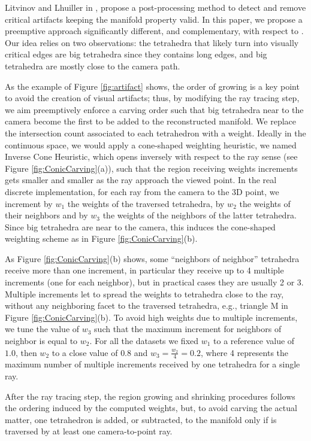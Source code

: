 Litvinov and Lhuiller in \cite{litvinov_Lhiuller14}, propose a post-processing method to detect and remove critical artifacts keeping the manifold property valid.
In this paper, we propose a preemptive approach significantly different, and complementary, with respect to \cite{litvinov_Lhiuller14}. 
Our idea relies on two observations: the tetrahedra that likely turn into visually critical edges are big tetrahedra since they contains long edges, and big tetrahedra are mostly close to the camera path.

As the example of Figure \ref{fig:artifact} shows, the order of growing is a key point to avoid the creation of visual artifacts; thus,
 by modifying the ray tracing step, we aim preemptively enforce a carving order such that big tetrahedra near to the camera become the first to be added to the reconstructed manifold.
We replace the intersection count associated to each tetrahedron with a weight. Ideally in the continuous space, we would apply  a cone-shaped weighting heuristic, we named Inverse Cone Heuristic, which opens inversely with respect to the ray sense (see Figure \ref{fig:ConicCarving}(a)),  such that the region receiving weights increments gets smaller and smaller as the ray approach the viewed point.
In the real discrete implementation, for each ray from the camera to the 3D point, we increment by $w_1$ the weights of the traversed tetrahedra, by $w_2$ the weights of their neighbors and by $w_3$ the weights of the neighbors of the latter tetrahedra.
Since big tetrahedra are near to the camera, this induces the cone-shaped weighting scheme as in Figure \ref{fig:ConicCarving}(b).

As Figure \ref{fig:ConicCarving}(b) shows, some ``neighbors of neighbor'' tetrahedra receive more than one increment, in particular they receive up to 4 multiple increments (one for each neighbor), but in practical cases they are usually 2 or 3.
Multiple increments let to spread the weights to tetrahedra close to the ray, without any  neighboring facet to the traversed tetrahedra, e.g.,  triangle M in Figure \ref{fig:ConicCarving}(b).
To avoid high weights due to multiple increments, we tune the value of $w_3$ such that the maximum increment for neighbors of neighbor is equal to $w_2$.
For all the datasets we fixed $w_1$ to a reference value of $1.0$, then $w_2$ to a close value of $0.8$ and $w_3 = \frac{w_2}{4} = 0.2$, where 4 represents the maximum number of multiple increments received by one tetrahedra for a single ray. 


After the ray tracing step, the region growing and shrinking procedures follows the ordering induced by the computed weights, but, to avoid carving the actual matter, one tetrahedron is added, or subtracted, to the manifold only if is traversed by at least one camera-to-point ray.




